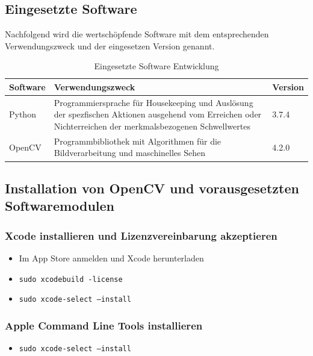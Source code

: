\subsection{Eingesetzte Software}
Nachfolgend wird die wertschöpfende Software mit dem entsprechenden Verwendungszweck und der eingesetzen Version genannt.
\begin{table}[H]
	
	\begin{tabular}{p{3cm} p{8cm} p{3cm} }
		
		\toprule[1pt]
		\rowcolor{maroon!30}
		
		Software & Verwendungszweck & Version\\
		
		\midrule 
		Python  & Programmiersprache für Housekeeping und Auslösung der spezfischen Aktionen ausgehend vom Erreichen oder Nichterreichen der merkmalsbezogenen Schwellwertes & 3.7.4\\
		OpenCV &  Programmbibliothek mit Algorithmen für die Bildverarbeitung und maschinelles Sehen & 4.2.0 \\ 		

		\bottomrule
	\end{tabular}
	\caption{Eingesetzte Software Entwicklung}
	\label{fig: Eingesetzte Software Entwicklung}
\end{table}

\subsection{Installation von OpenCV und vorausgesetzten Softwaremodulen}

\subsubsection{Xcode installieren und Lizenzvereinbarung akzeptieren} 
\begin{itemize}
	\item Im App Store anmelden und Xcode herunterladen
	\item \texttt{sudo xcodebuild -license}
	\item \texttt{sudo xcode-select --install}
\end{itemize}

\subsubsection{Apple Command Line Tools installieren} 
\begin{itemize}
	\item \texttt{sudo xcode-select --install}
\end{itemize}

